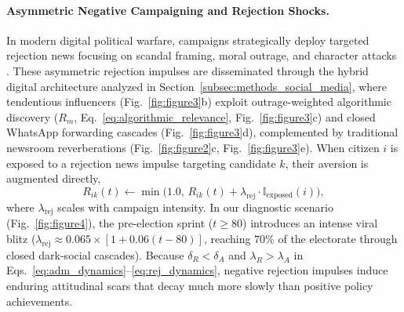 \documentclass{article}
\begin{document}
\paragraph{Asymmetric Negative Campaigning and Rejection Shocks.}
In modern digital political warfare, campaigns strategically deploy targeted rejection news focusing on scandal framing, moral outrage, and character attacks \citep{janones2023janonismo, cesarino2020posverdade}. These asymmetric rejection impulses are disseminated through the hybrid digital architecture analyzed in Section~\ref{subsec:methods_social_media}, where tendentious influencers (Fig.~\ref{fig:figure3}b) exploit outrage-weighted algorithmic discovery ($R_m$, Eq.~\eqref{eq:algorithmic_relevance}, Fig.~\ref{fig:figure3}c) and closed WhatsApp forwarding cascades (Fig.~\ref{fig:figure3}d), complemented by traditional newsroom reverberations (Fig.~\ref{fig:figure2}c, Fig.~\ref{fig:figure3}e). When citizen $i$ is exposed to a rejection news impulse targeting candidate $k$, their aversion is augmented directly,
\begin{equation}
    R_{ik}(t) \leftarrow \min\!\big(1.0,\, R_{ik}(t) + \lambda_{\mathrm{rej}} \cdot \mathbb{I}_{\mathrm{exposed}}(i)\big),
    \label{eq:rejection_shock}
\end{equation}
where $\lambda_{\mathrm{rej}}$ scales with campaign intensity. In our diagnostic scenario (Fig.~\ref{fig:figure4}), the pre-election sprint ($t \ge 80$) introduces an intense viral blitz ($\lambda_{\mathrm{rej}} \approx 0.065 \times [1 + 0.06(t - 80)]$, reaching $70\%$ of the electorate through closed dark-social cascades). Because $\delta_R < \delta_A$ and $\lambda_R > \lambda_A$ in Eqs.~\eqref{eq:adm_dynamics}--\eqref{eq:rej_dynamics}, negative rejection impulses induce enduring attitudinal scars that decay much more slowly than positive policy achievements.
\end{document}

